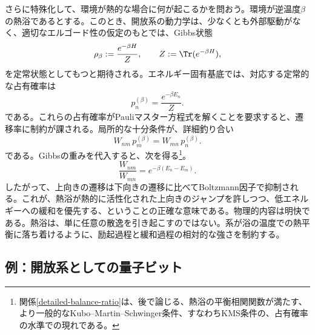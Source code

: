 \documentclass[a4paper,11pt,oneside]{article}
\theoremstyle{definition}
\numberwithin{equation}{section}
\begin{document}
さらに特殊化して、環境が熱的な場合に何が起こるかを問おう。環境が逆温度$\beta$の熱浴であるとする。このとき、開放系の動力学は、少なくとも外部駆動がなく、適切なエルゴード性の仮定のもとでは、Gibbs状態
\begin{equation}\label{Gibbs-state}
\rho_\beta
:=
\frac{e^{-\beta H}}{Z} ,
\qquad
Z := \Tr(e^{-\beta H}) ,
\end{equation}
を定常状態としてもつと期待される。エネルギー固有基底では、対応する定常的な占有確率は
\begin{equation}
p_n^{(\beta)}
=
\frac{e^{-\beta E_n}}{Z} .
\end{equation}
である。これらの占有確率がPauliマスター方程式を解くことを要求すると、遷移率に制約が課される。局所的な十分条件が、詳細釣り合い
\begin{equation}\label{detailed-balance}
W_{nm}\,p_m^{(\beta)} = W_{mn}\,p_n^{(\beta)} .
\end{equation}
である。Gibbsの重みを代入すると、次を得る\footnote{関係\eqref{detailed-balance-ratio}は、後で論じる、熱浴の平衡相関関数が満たす、より一般的なKubo--Martin--Schwinger条件、すなわちKMS条件の、占有確率の水準での現れである。}。
\begin{equation}\label{detailed-balance-ratio}
\frac{W_{nm}}{W_{mn}}
=
e^{-\beta(E_n-E_m)} .
\end{equation}
したがって、上向きの遷移は下向きの遷移に比べてBoltzmann因子で抑制される。これが、熱浴が熱的に活性化された上向きのジャンプを許しつつ、低エネルギーへの緩和を優先する、ということの正確な意味である。物理的内容は明快である。熱浴は、単に任意の散逸を引き起こすのではない。系が浴の温度での熱平衡に落ち着けるように、励起過程と緩和過程の相対的な強さを制約する。







\subsection{例：開放系としての量子ビット}
\end{document}
